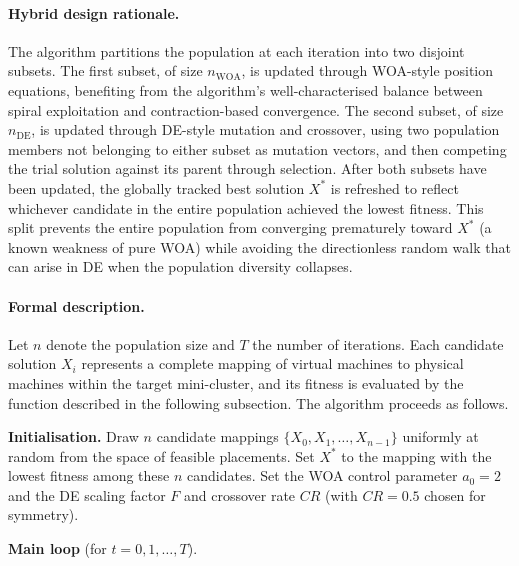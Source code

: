 \documentclass[a4paper, 12pt]{report}
\begin{document}
\paragraph{Hybrid design rationale.}
The algorithm partitions the population at each iteration into two
disjoint subsets.  The first subset, of size $n_\mathrm{WOA}$, is
updated through WOA-style position equations, benefiting from the
algorithm's well-characterised balance between spiral exploitation and
contraction-based convergence.  The second subset, of size
$n_\mathrm{DE}$, is updated through DE-style mutation and crossover,
using two population members not belonging to either subset as mutation
vectors, and then competing the trial solution against its parent
through selection.  After both subsets have been updated, the globally
tracked best solution $X^*$ is refreshed to reflect whichever candidate
in the entire population achieved the lowest fitness.  This split
prevents the entire population from converging prematurely toward $X^*$
(a known weakness of pure WOA) while avoiding the directionless random
walk that can arise in DE when the population diversity collapses.

\paragraph{Formal description.}
Let $n$ denote the population size and $T$ the number of iterations.
Each candidate solution $X_i$ represents a complete mapping of virtual
machines to physical machines within the target mini-cluster, and its
fitness is evaluated by the function described in the following
subsection.  The algorithm proceeds as follows.

\medskip
\noindent\textbf{Initialisation.}
Draw $n$ candidate mappings $\{X_0, X_1, \ldots, X_{n-1}\}$ uniformly
at random from the space of feasible placements.  Set $X^*$ to the
mapping with the lowest fitness among these $n$ candidates.  Set the
WOA control parameter $a_0 = 2$ and the DE scaling factor $F$ and
crossover rate $CR$ (with $CR = 0.5$ chosen for symmetry).

\medskip
\noindent\textbf{Main loop} (for $t = 0, 1, \ldots, T$).
\end{document}
